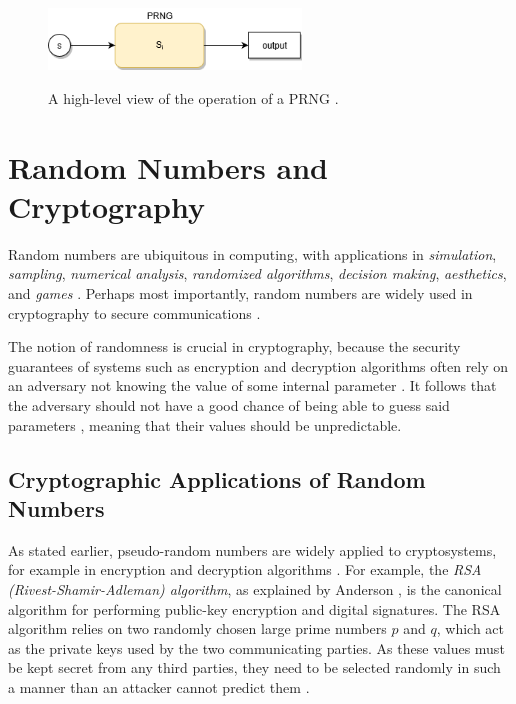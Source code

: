 \documentclass[12pt, titlepage]{report}
\theoremstyle{definition}
\begin{document}
\begin{figure}
\centering
\includegraphics[width=0.6\textwidth]{img/conceptual_prng.png}\\
\caption[High-level PRNG operation]{A high-level view of the operation of a PRNG \cite{kelsey1998cryptanalytic}.}
\label{figure:prng_high_level}
\end{figure}



\section{Random Numbers and Cryptography}
Random numbers are ubiquitous in computing, with applications in \emph{simulation}, \emph{sampling}, \emph{numerical analysis}, \emph{randomized algorithms}, \emph{decision making}, \emph{aesthetics}, and \emph{games} \cite[p. 1-2]{donald1998art}. Perhaps most importantly, random numbers are widely used in cryptography to secure communications \cite[p. 137]{ferguson2010cryptography}.

The notion of randomness is crucial in cryptography, because the security guarantees of systems such as encryption and decryption algorithms often rely on an adversary not knowing the value of some internal parameter \cite[p. 169]{menezes1996handbook} \cite[p. 1]{kelsey1998cryptanalytic}. It follows that the adversary should not have a good chance of being able to guess said parameters \cite[p. 2]{kelsey1998cryptanalytic}, meaning that their values should be unpredictable.


\subsection{Cryptographic Applications of Random Numbers}
As stated earlier, pseudo-random numbers are widely applied to cryptosystems, for example in encryption and decryption algorithms \cite[p. 169]{menezes1996handbook}. For example, the \emph{RSA (Rivest-Shamir-Adleman) algorithm}, as explained by Anderson \cite{anderson2010security}, is the canonical algorithm for performing public-key encryption and digital signatures. The RSA algorithm relies on two randomly chosen large prime numbers $p$ and $q$, which act as the private keys used by the two communicating parties. As these values must be kept secret from any third parties, they need to be selected randomly in such a manner than an attacker cannot predict them \cite[p. 171]{anderson2010security}.
\end{document}
